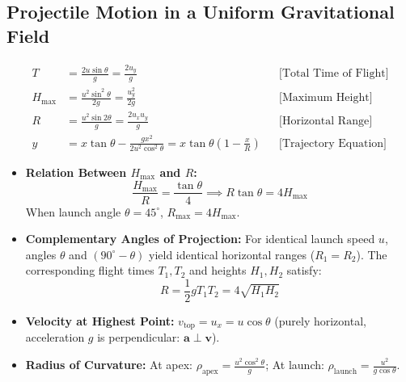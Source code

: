 \documentclass[10pt,twoside,openright]{book}
\begin{document}
\subsection{Projectile Motion in a Uniform Gravitational Field}

\begin{formulabox}
\begin{align}
  T &= \frac{2u\sin\theta}{g} = \frac{2u_y}{g} && \text{[Total Time of Flight]} \\
  H_{\max} &= \frac{u^2\sin^2\theta}{2g} = \frac{u_y^2}{2g} && \text{[Maximum Height]} \\
  R &= \frac{u^2\sin 2\theta}{g} = \frac{2u_x u_y}{g} && \text{[Horizontal Range]} \\
  y &= x\tan\theta - \frac{g x^2}{2u^2\cos^2\theta} = x\tan\theta\left(1 - \frac{x}{R}\right) && \text{[Trajectory Equation]}
\end{align}
\end{formulabox}

\begin{usecasebox}
\begin{itemize}
  \item \textbf{Relation Between $H_{\max}$ and $R$:}
  \begin{equation*}
    \frac{H_{\max}}{R} = \frac{\tan\theta}{4} \implies R\tan\theta = 4H_{\max}
  \end{equation*}
  When launch angle $\theta = 45^\circ$, $R_{\max} = 4H_{\max}$.
  \item \textbf{Complementary Angles of Projection:} For identical launch speed $u$, angles $\theta$ and $(90^\circ - \theta)$ yield identical horizontal ranges ($R_1 = R_2$). The corresponding flight times $T_1, T_2$ and heights $H_1, H_2$ satisfy:
  \begin{equation*}
    R = \frac{1}{2}g T_1 T_2 = 4\sqrt{H_1 H_2}
  \end{equation*}
  \item \textbf{Velocity at Highest Point:} $v_{\text{top}} = u_x = u\cos\theta$ (purely horizontal, acceleration $g$ is perpendicular: $\mathbf{a} \perp \mathbf{v}$).
  \item \textbf{Radius of Curvature:} At apex: $\rho_{\text{apex}} = \frac{u^2\cos^2\theta}{g}$; At launch: $\rho_{\text{launch}} = \frac{u^2}{g\cos\theta}$.
\end{itemize}
\end{usecasebox}
\end{document}
